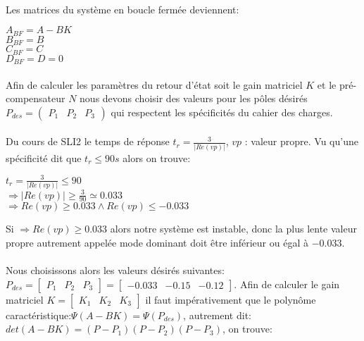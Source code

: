 		\paragraph{} Les matrices du système en boucle fermée deviennent:\\
		
		\begin{center}
			
			$A_{BF}=A-BK$\\
			 $B_{BF}=B$\\
			 $C_{BF}=C$\\
			 $D_{BF}=D=0$			
			
		\end{center}				
		
		\paragraph{}
			Afin de calculer les paramètres du retour d'état soit le gain matriciel $K$ et le pré-compensateur $N$ nous devons choisir des valeurs pour les pôles désirés $P_{des}=\begin{pmatrix} P_1 & P_2 & P_3 \end{pmatrix} $ qui respectent les spécificités du cahier des charges.\\
		
		\paragraph{} Du cours de SLI2 le temps de réponse $t_r =\frac{3}{|Re(vp)|} $, $vp$ : valeur propre. Vu qu'une spécificité dit que $t_r \leqslant 90s$ alors on trouve:\\
		
		\begin{center}
				
				$t_r =\frac{3}{|Re(vp)|}\leqslant 90 $\\[1cm]
				$\Rightarrow|Re(vp)| \geqslant \frac{3}{90} \simeq 0.033 $\\[1cm]
				$\Rightarrow Re(vp) \geqslant 0.033 \wedge Re(vp) \leqslant -0.033$
		\end{center}
		Si $\Rightarrow Re(vp) \geqslant 0.033$ alors notre système est instable, donc la plus lente valeur propre autrement appelée mode dominant doit être inférieur ou égal à $-0.033$.\\\\
		
		Nous choisissons alors les valeurs désirés suivantes: $P_{des}= \begin{bmatrix} P_1&P_2&P_3\end{bmatrix}=\begin{bmatrix} -0.033&-0.15&-0.12 \end{bmatrix} $. Afin de calculer le gain matriciel $K=\begin{bmatrix} K_1 & K_2 & K_3 \end{bmatrix}$ il faut impérativement que le polynôme caractéristique:$ \Psi(A-BK)= \Psi(P_{des})$, autrement dit: $det(A-BK)=(P-P_1)(P-P_2)(P-P_3)$, on trouve:\\
		
